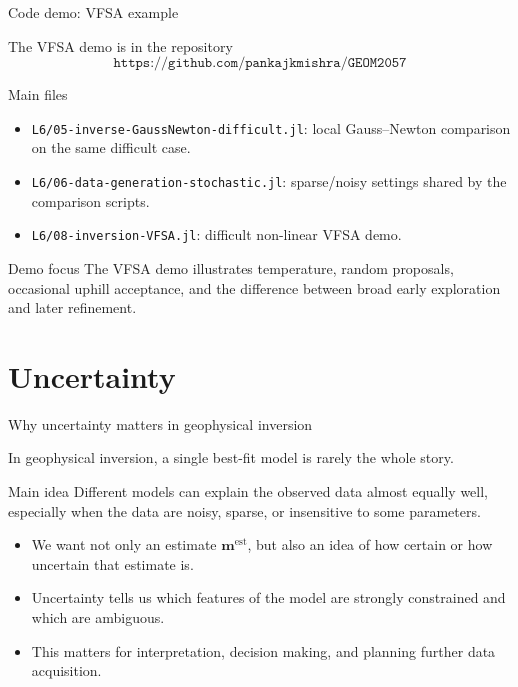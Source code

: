 \documentclass[aspectratio=169]{beamer}
\renewcommand{\vec}[1]{\mathbf{#1}}
\newcommand{\mest}{ {\vec{m}^{\text{est}}} }
\newcommand{\courserepo}{\texttt{https://github.com/pankajkmishra/GEOM2057}}
\begin{document}
\begin{frame}{Code demo: VFSA example}
\small

The VFSA demo is in the repository
\[
\courserepo
\]

\begin{block}{Main files}
\begin{itemize}
    \item[--] \texttt{L6/05-inverse-GaussNewton-difficult.jl}: local Gauss--Newton comparison on the same difficult case.
    \item[--] \texttt{L6/06-data-generation-stochastic.jl}: sparse/noisy settings shared by the comparison scripts.
    \item[--] \texttt{L6/08-inversion-VFSA.jl}: difficult non-linear VFSA demo.
\end{itemize}
\end{block}

\begin{alertblock}{Demo focus}
The VFSA demo illustrates temperature, random proposals, occasional uphill acceptance, and the difference between broad early exploration and later refinement.
\end{alertblock}
\end{frame}

\section{Uncertainty}

\begin{frame}{Why uncertainty matters in geophysical inversion}
\small

In geophysical inversion, a single best-fit model is rarely the whole story.

\begin{alertblock}{Main idea}
Different models can explain the observed data almost equally well, especially when the data are noisy, sparse, or insensitive to some parameters.
\end{alertblock}

\begin{itemize}
    \item[--] We want not only an estimate $\mest$, but also an idea of \alert{how certain} or \alert{how uncertain} that estimate is.
    \item[--] Uncertainty tells us which features of the model are strongly constrained and which are ambiguous.
    \item[--] This matters for interpretation, decision making, and planning further data acquisition.
\end{itemize}
\end{frame}
\end{document}
